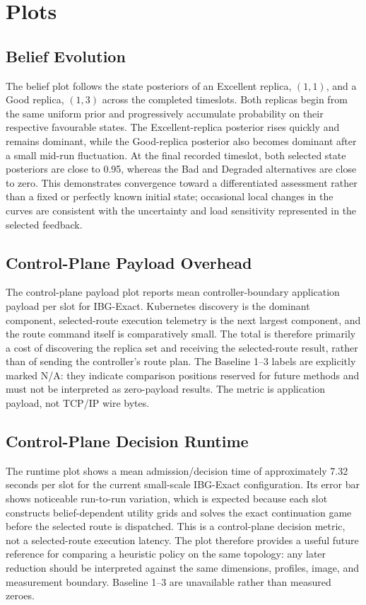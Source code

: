 \documentclass[12pt,a4paper]{article}
\begin{document}
\section{Plots}

\subsection{Belief Evolution}
The belief plot follows the state posteriors of an Excellent replica, $(1,1)$, and a Good replica, $(1,3)$ across the completed timeslots. Both replicas begin from the same uniform prior and progressively accumulate probability on their respective favourable states. The Excellent-replica posterior rises quickly and remains dominant, while the Good-replica posterior also becomes dominant after a small mid-run fluctuation. At the final recorded timeslot, both selected state posteriors are close to 0.95, whereas the Bad and Degraded alternatives are close to zero. This demonstrates convergence toward a differentiated assessment rather than a fixed or perfectly known initial state; occasional local changes in the curves are consistent with the uncertainty and load sensitivity represented in the selected feedback.

\subsection{Control-Plane Payload Overhead}
The control-plane payload plot reports mean controller-boundary application payload per slot for IBG-Exact. Kubernetes discovery is the dominant component, selected-route execution telemetry is the next largest component, and the route command itself is comparatively small. The total is therefore primarily a cost of discovering the replica set and receiving the selected-route result, rather than of sending the controller's route plan. The Baseline 1--3 labels are explicitly marked N/A: they indicate comparison positions reserved for future methods and must not be interpreted as zero-payload results. The metric is application payload, not TCP/IP wire bytes.

\subsection{Control-Plane Decision Runtime}
The runtime plot shows a mean admission/decision time of approximately 7.32 seconds per slot for the current small-scale IBG-Exact configuration. Its error bar shows noticeable run-to-run variation, which is expected because each slot constructs belief-dependent utility grids and solves the exact continuation game before the selected route is dispatched. This is a control-plane decision metric, not a selected-route execution latency. The plot therefore provides a useful future reference for comparing a heuristic policy on the same topology: any later reduction should be interpreted against the same dimensions, profiles, image, and measurement boundary. Baseline 1--3 are unavailable rather than measured zeroes.
\end{document}
